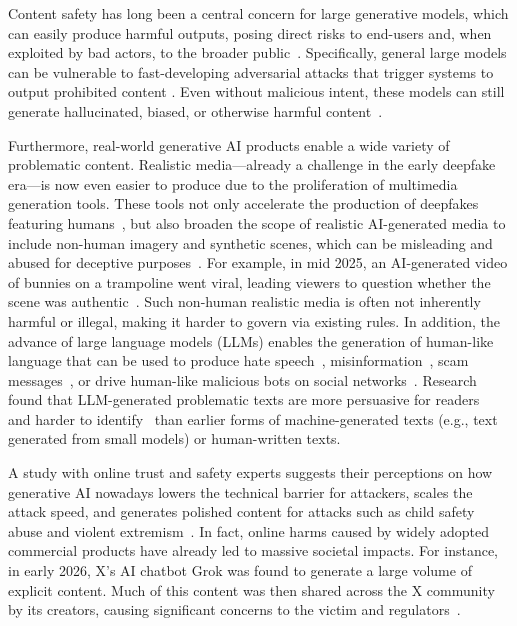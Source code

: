 Content safety has long been a central concern for large generative models, which can easily produce harmful outputs, posing direct risks to end-users and, when exploited by bad actors, to the broader public~\cite{gao2025cannot}. Specifically, general large models can be vulnerable to fast-developing adversarial attacks that trigger systems to output prohibited content \cite{yi2024jailbreak}. Even without malicious intent, these models can still generate hallucinated, biased, or otherwise harmful content~\cite{rawte2023survey, wan2023kelly}. 

Furthermore, real-world generative AI products enable a wide variety of problematic content. Realistic media---already a challenge in the early deepfake era---is now even easier to produce due to the proliferation of multimedia generation tools. These tools not only accelerate the production of deepfakes featuring humans~\cite{gibson2025analyzing}, but also broaden the scope of realistic AI-generated media to include non-human imagery and synthetic scenes, which can be misleading and abused for deceptive purposes~\cite{peng2025crafting, lu2023seeing}. For example, in mid 2025, an AI-generated video of bunnies on a trampoline went viral, leading viewers to question whether the scene was authentic~\cite{media2025aibunnies}. Such non-human realistic media is often not inherently harmful or illegal, making it harder to govern via existing rules. In addition, the advance of large language models (LLMs) enables the generation of human-like language that can be used to produce hate speech~\cite{shen2025hatebench}, misinformation~\cite{zhou2023synthetic}, scam messages~\cite{roy2024chatbots}, or drive human-like malicious bots on social networks~\cite{yang2023anatomy}. Research found that LLM-generated problematic texts are more persuasive for readers~\cite{bai2025llm, salvi2025conversational} and harder to identify~\cite{zhou2023synthetic} than earlier forms of machine-generated texts (e.g., text generated from small models) or human-written texts.

A study with online trust and safety experts suggests their perceptions on how generative AI nowadays lowers the technical barrier for attackers, scales the attack speed, and generates polished content for attacks such as child safety abuse and violent extremism~\cite{kelley2025generative}. In fact, online harms caused by widely adopted commercial products have already led to massive societal impacts. For instance, in early 2026, X's AI chatbot Grok was found to generate a large volume of explicit content. Much of this content was then shared across the X community by its creators, causing significant concerns to the victim and regulators~\cite{nytimes2026grok}.

